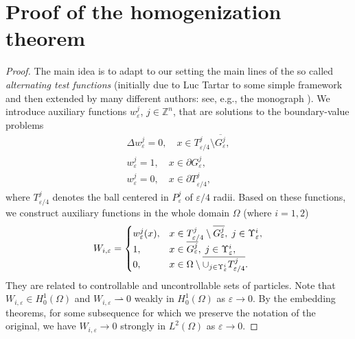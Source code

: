 \documentclass[reqno]{amsart}
\begin{document}
\section{Proof of the homogenization theorem}

\begin{proof}
The main idea is to adapt to our setting the main lines of the so called
\textit{alternating test functions} (initially due to Luc Tartar to some
simple framework and then extended by many different authors: see, e.g., the
monograph \cite{DiGoShBook}). 
We introduce auxiliary functions $w_{\varepsilon }^{j}$, $j\in \mathbb{Z}^n$, 
that are solutions to the boundary-value problems
\begin{equation}
\begin{gathered}
\Delta {w}_{\varepsilon }^{j}=0, \quad x\in T_{{\varepsilon }/4}^{j}\setminus
\overline{G_{\varepsilon }^{j}}, \\
w_{\varepsilon }^{j}=1, \quad x\in \partial {G_{\varepsilon }^{j}}, \\
w_{\varepsilon }^{j}=0, \quad x\in \partial {T_{{\varepsilon }/4}^{j}},%
\end{gathered}   \label{def: auxiliary func w}
\end{equation}%
where $T_{{\varepsilon }/4}^{j}$ denotes the ball centered in 
$P_{\varepsilon }^{j}$ of ${{\varepsilon }/4}$ radii. Based on these
functions, we construct auxiliary functions in the whole domain $\Omega $
(where $i=1,2$)
\begin{equation}
W_{i,\varepsilon }=\begin{cases}
w_{\varepsilon }^{j}(x), & x\in T_{\varepsilon /4}^{j}\setminus \overline{%
G_{\varepsilon }^{j}},\; j\in \Upsilon _{\varepsilon }^{i}, \\
1, & x\in \overline{G_{\varepsilon }^{j}},\; j\in \Upsilon _{\varepsilon
}^{i}, \\
0, & x\in \Omega \setminus \overline{\cup _{j\in \Upsilon
_{\varepsilon }^{i}}{T_{{\varepsilon }/4}^{j}}}.%
\end{cases}   \label{def: W aux func}
\end{equation}%
They are related to controllable and uncontrollable sets of particles.
Note that $W_{i,\varepsilon }\in H_0^{1}(\Omega )$ and 
$W_{i,\varepsilon }\rightharpoonup 0$ weakly in $H_0^{1}(\Omega )$ as 
$\varepsilon \to 0$. By the embedding theorems, for some subsequence for
which we preserve the notation of the original, we have 
$W_{i,\varepsilon }\to 0$ strongly in $L^2(\Omega )$ as $\varepsilon \to 0$.


\end{proof}
\end{document}
